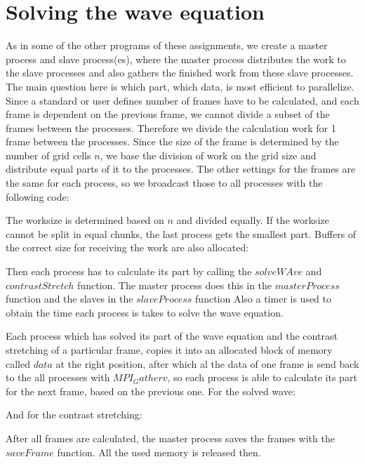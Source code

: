 \documentclass[a4paper]{article}
\begin{document}
\section{Solving the wave equation}
As in some of the other programs of these assignments, we create a master process and slave process(es), where the master process distributes the work to the slave processes and also gathers the finished work from these slave processes. The main question here is which part, which data, is most efficient to parallelize. Since a standard or user defines number of frames have to be calculated, and each frame is dependent on the previous frame, we cannot divide a subset of the frames between the processes. Therefore we divide the calculation work for 1 frame between the processes. Since the size of the frame is determined by the number of grid cells $n$, we base the division of work on the grid size and distribute equal parts of it to the processes. The other settings for the frames are the same for each process, so we broadcast those to all processes with the following code:

The worksize is determined based on $n$ and divided equally. If the worksize cannot be split in equal chunks, the last process gets the smallest part. Buffers of the correct size for receiving the work are also allocated:

Then each process has to calculate its part by calling the $solveWAve$ and $contrastStretch$ function. The master process does this in the $masterProcess$ function and the slaves in the $slaveProcess$ function  Also a timer is used to obtain the time each process is takes to solve the wave equation. 

Each process which has solved its part of the wave equation and the contrast stretching of a particular frame, copies it into an allocated block of memory called $data$ at the right position, after which al the data of one frame is send back to the all processes with $MPI_Gatherv$, so each process is able to calculate its part for the next frame, based on the previous one. For the solved wave:

And for the contrast stretching:

After all frames are calculated, the master process saves the frames with the $saveFrame$ function. All the used memory is released then.
\end{document}
